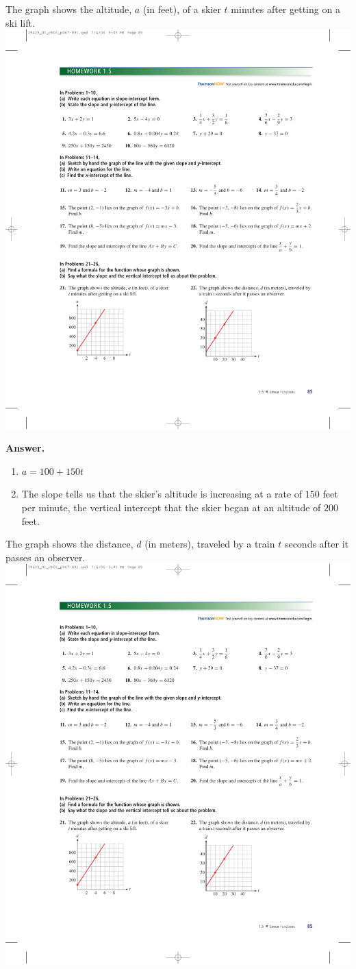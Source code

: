 \documentclass[10pt,]{book}
\theoremstyle{plain}
\theoremstyle{definition}
\theoremstyle{definition}
\theoremstyle{definition}
\theoremstyle{definition}
\numberwithin{equation}{part}
\begin{document}
\begin{exerciselist}
\begin{exercisegroup}
\exercise[21.]\hypertarget{exercise-307}{}The graph shows the altitude, \(a\) (in feet), of a skier \(t\) minutes after getting on a ski lift. \includegraphics[width=0.8\linewidth]{images/fig-ex-1-5-21}
%
\par\smallskip
\noindent\textbf{Answer.}\hypertarget{answer-174}{}\quad
\leavevmode%
\begin{enumerate}[label=*\alph**]
\item\hypertarget{li-1170}{}\(a = 100 + 150t\)%
\item\hypertarget{li-1171}{}The slope tells us that the skier's altitude is increasing at a rate of \(150\) feet per minute, the vertical intercept that the skier began at an altitude of \(200\) feet.%
\end{enumerate}
%
\exercise[22.]\hypertarget{exercise-308}{}The graph shows the distance, \(d\) (in meters), traveled by a train \(t\) seconds after it passes an observer. \includegraphics[width=0.8\linewidth]{images/fig-ex-1-5-22}

\end{exercisegroup}
\end{exerciselist}
\end{document}
